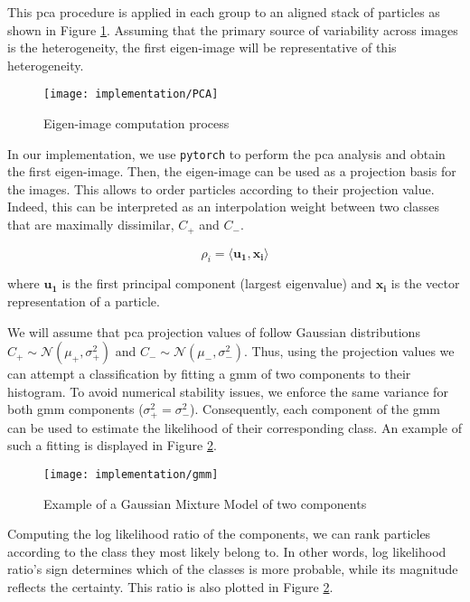 \documentclass[../main.tex]{subfiles}
\begin{document}
This \gls{pca} procedure is applied in each group to an aligned stack of particles as shown in Figure \ref{fig:4.1:eigenimage}. Assuming that the primary source of variability across images is the heterogeneity, the first eigen-image will be representative of this heterogeneity.

\begin{figure}[hbp]
    \centering
    \texttt{[image: implementation/PCA]}
    \caption{Eigen-image computation process}
    \label{fig:4.1:eigenimage}
\end{figure}

In our implementation, we use \texttt{pytorch}\cite{paszke2019} to perform the \gls{pca} analysis and obtain the first eigen-image. Then, the eigen-image can be used as a projection basis for the images. This allows to order particles according to their projection value. Indeed, this can be interpreted as an interpolation weight between two classes that are maximally dissimilar, $C_+$ and $C_-$.

\begin{equation}\label{eq:4.1:pca_projection}
    \rho_i = \langle \bm{u_1}, \bm{x_i} \rangle
\end{equation}

where $\bm{u_1}$ is the first principal component (largest eigenvalue) and $\bm{x_i}$ is the vector representation of a particle.

We will assume that \gls{pca} projection values of follow Gaussian distributions $C_+ \sim \mathcal{N}(\mu_+, \sigma_+^2)$ and $C_- \sim \mathcal{N}(\mu_-, \sigma_-^2)$. Thus, using the projection values we can attempt a classification by fitting a \gls{gmm} of two components to their histogram. To avoid numerical stability issues, we enforce the same variance for both \gls{gmm} components ($\sigma_+^2 = \sigma_-^2$). Consequently, each component of the \gls{gmm} can be used to estimate the likelihood of their corresponding class. An example of such a fitting is displayed in Figure \ref{fig:4.1:gmm}.

\begin{figure}[hbp]
    \centering
    \texttt{[image: implementation/gmm]}
    \caption{Example of a Gaussian Mixture Model of two components}
    \label{fig:4.1:gmm}
\end{figure}

Computing the log likelihood ratio of the components, we can rank particles according to the class they most likely belong to. In other words, log likelihood ratio's sign determines which of the classes is more probable, while its magnitude reflects the certainty. This ratio is also plotted in Figure \ref{fig:4.1:gmm}.
\end{document}
